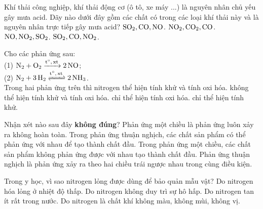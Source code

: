 \documentclass[12pt,a4paper]{article}
\begin{document}
\begin{ex}
Khí thải công nghiệp, khí thải động cơ (ô tô, xe máy ...) là nguyên nhân chủ yếu gây mưa acid. Dãy nào dưới đây gồm các chất có trong các loại khí thải này và là nguyên nhân trực tiếp gây mưa acid?
\choice
{$\ce{SO2}, \ce{CO}, \ce{NO}$.}
{$\ce{NO2}, \ce{CO2}, \ce{CO}$.}
{\True $\ce{NO}, \ce{NO2}, \ce{SO2}$.}
{$\ce{SO2}, \ce{CO}, \ce{NO2}$.}
\end{ex}

\begin{ex}
Cho các phản ứng sau:\\
(1) $\ce{N2 + O2 ->[t^\circ, xt] 2NO}$;\\
(2) $\ce{N2 + 3H2 <=>[t^\circ, xt] 2NH3}$.\\
Trong hai phản ứng trên thì nitrogen
\choice
{\True thể hiện tính khử và tính oxi hóa.}
{không thể hiện tính khử và tính oxi hóa.}
{chỉ thể hiện tính oxi hóa.}
{chỉ thể hiện tính khử.}
\end{ex}

\begin{ex}
Nhận xét nào sau đây \textbf{không đúng}?
\choice
{\True Phản ứng một chiều là phản ứng luôn xảy ra không hoàn toàn.}
{Trong phản ứng thuận nghịch, các chất sản phẩm có thể phản ứng với nhau để tạo thành chất đầu.}
{Trong phản ứng một chiều, các chất sản phẩm không phản ứng được với nhau tạo thành chất đầu.}
{Phản ứng thuận nghịch là phản ứng xảy ra theo hai chiều trái ngược nhau trong cùng điều kiện.}
\end{ex}

\begin{ex}
Trong y học, vì sao nitrogen lỏng được dùng để bảo quản mẫu vật?
\choice
{\True Do nitrogen hóa lỏng ở nhiệt độ thấp.}
{Do nitrogen không duy trì sự hô hấp.}
{Do nitrogen tan ít rất trong nước.}
{Do nitrogen là chất khí không màu, không mùi, không vị.}
\end{ex}
\end{document}
